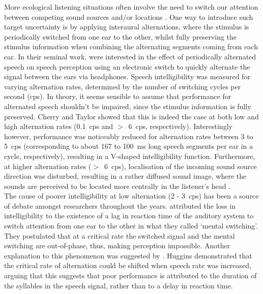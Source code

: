 \documentclass[a4paper, twoside]{templates/ociamthesis}
\begin{document}
More ecological listening situations often involve the need to switch our attention between competing sound sources and/or locations \autocite{Bronkhorst2015}. One way to introduce such target uncertainty is by applying interaural alternations, where the stimulus is periodically switched from one ear to the other, whilst fully preserving the stimulus information when combining the alternating segments coming from each ear. In their seminal work, \textcite{Cherry1954} were interested in the effect of periodically alternated speech on speech perception using an electronic switch to quickly alternate the signal between the ears via headphones. Speech intelligibility was measured for varying alternation rates, determined by the number of switching cycles per second (cps). In theory, it seems sensible to assume that performance for alternated speech shouldn't be impaired, since the stimulus information is fully preserved. Cherry and Taylor showed that this is indeed the case at both low and high alternation rates (0.1~cps and \(>\)~6~cps, respectively). Interestingly however, performance was noticeably reduced for alternation rates between 3 to 5~cps (corresponding to about 167 to 100~ms long speech segments per ear in a cycle, respectively), resulting in a V-shaped intelligibility function. Furthermore, at higher alternation rates (\(>\)~6~cps), localisation of the incoming sound source direction was disturbed, resulting in a rather diffused sound image, where the sounds are perceived to be located more centrally in the listener's head \autocite{Hoffman1978}.\\

The cause of poorer intelligibility at low alternation (2 - 3~cps) has been a source of debate amongst researchers throughout the years. \textcite{Cherry1954} attributed the loss in intelligibility to the existence of a lag in reaction time of the auditory system to switch attention from one ear to the other in what they called `mental switching'. They postulated that at a critical rate the switched signal and the mental switching are out-of-phase, thus, making perception impossible. Another explanation to this phenomenon was suggested by \textcite{Huggins1964}. Huggins demonstrated that the critical rate of alternation could be shifted when speech rate was increased, arguing that this suggests that poor performance is attributed to the duration of the syllables in the speech signal, rather than to a delay in reaction time.
\end{document}
